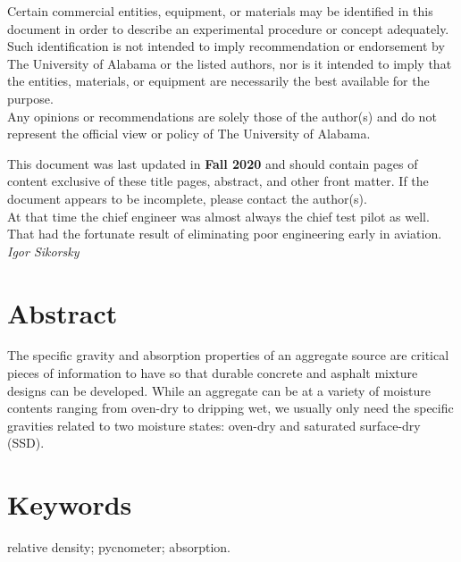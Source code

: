 \documentclass[12pt]{article}
\newcommand{\LastUpdate}{Fall 2020}
\begin{document}
\begin{titlepage}
\begin{center}
\normalsize 
Certain commercial entities, equipment, or materials may be identified in this document in order to describe an experimental procedure or concept adequately. Such identification is not intended to imply recommendation or endorsement by The University of Alabama or the listed authors, nor is it intended to imply that the entities, materials, or equipment are necessarily the best available for the purpose.\\
\vfill
Any opinions or recommendations are solely those of the author(s) and do not represent the official view or policy of The University of Alabama.
\end{center}
\begin{flushright}
\vfill
\normalsize 
This document was last updated in \textbf{\LastUpdate} and should contain \textbf{\pageref{LastPage}} pages of content exclusive of these title pages, abstract, and other front matter. If the document appears to be incomplete, please contact the author(s).\\
\vfill
At that time the chief engineer was almost always the chief test pilot as well.\\That had the fortunate result of eliminating poor engineering early in aviation.\\
\textit{Igor Sikorsky}
\end{flushright}
\end{titlepage}
\section*{Abstract}
\normalsize The specific gravity and absorption properties of an aggregate source are critical pieces of information to have so that durable concrete and asphalt mixture designs can be developed. While an aggregate can be at a variety of moisture contents ranging from oven-dry to dripping wet, we usually only need the specific gravities related to two moisture states: oven-dry and saturated surface-dry (SSD).

\vfill
\section*{Keywords}
\normalsize relative density; pycnometer; absorption.\\
\pagebreak
\begin{center}
\tableofcontents
\pagebreak
\listoftables
\listoffigures
\end{center}
\pagebreak
\end{document}

